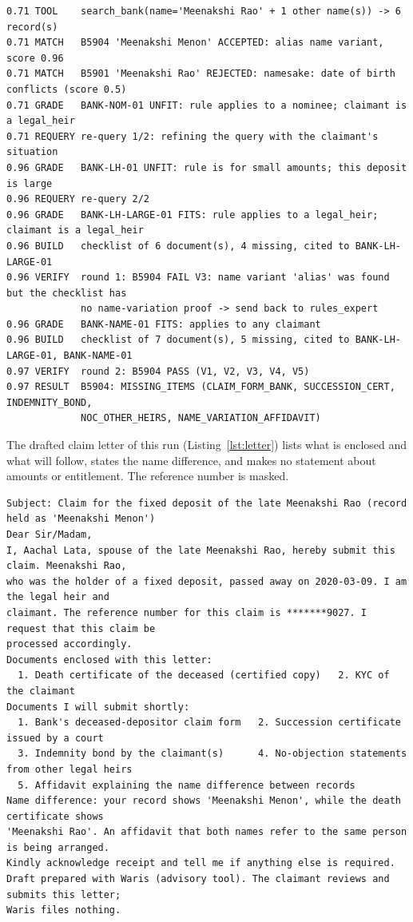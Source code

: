 \documentclass[12pt,a4paper,oneside]{report}
\begin{document}
\begin{lstlisting}[numbers=none,basicstyle=\ttfamily\tiny\setstretch{1.0},caption={Trace of a run with two re-queries and a Verifier send-back (case h19), condensed.},label={lst:h19}]
0.71 TOOL    search_bank(name='Meenakshi Rao' + 1 other name(s)) -> 6 record(s)
0.71 MATCH   B5904 'Meenakshi Menon' ACCEPTED: alias name variant, score 0.96
0.71 MATCH   B5901 'Meenakshi Rao' REJECTED: namesake: date of birth conflicts (score 0.5)
0.71 GRADE   BANK-NOM-01 UNFIT: rule applies to a nominee; claimant is a legal_heir
0.71 REQUERY re-query 1/2: refining the query with the claimant's situation
0.96 GRADE   BANK-LH-01 UNFIT: rule is for small amounts; this deposit is large
0.96 REQUERY re-query 2/2
0.96 GRADE   BANK-LH-LARGE-01 FITS: rule applies to a legal_heir; claimant is a legal_heir
0.96 BUILD   checklist of 6 document(s), 4 missing, cited to BANK-LH-LARGE-01
0.96 VERIFY  round 1: B5904 FAIL V3: name variant 'alias' was found but the checklist has
             no name-variation proof -> send back to rules_expert
0.96 GRADE   BANK-NAME-01 FITS: applies to any claimant
0.96 BUILD   checklist of 7 document(s), 5 missing, cited to BANK-LH-LARGE-01, BANK-NAME-01
0.97 VERIFY  round 2: B5904 PASS (V1, V2, V3, V4, V5)
0.97 RESULT  B5904: MISSING_ITEMS (CLAIM_FORM_BANK, SUCCESSION_CERT, INDEMNITY_BOND,
             NOC_OTHER_HEIRS, NAME_VARIATION_AFFIDAVIT)
\end{lstlisting}

The drafted claim letter of this run (Listing~\ref{lst:letter}) lists what is enclosed and what will follow, states the name difference, and makes no statement about amounts or entitlement. The reference number is masked.

\begin{lstlisting}[numbers=none,basicstyle=\ttfamily\tiny\setstretch{1.0},caption={Claim letter drafted for case h19 (synthetic).},label={lst:letter}]
Subject: Claim for the fixed deposit of the late Meenakshi Rao (record held as 'Meenakshi Menon')
Dear Sir/Madam,
I, Aachal Lata, spouse of the late Meenakshi Rao, hereby submit this claim. Meenakshi Rao,
who was the holder of a fixed deposit, passed away on 2020-03-09. I am the legal heir and
claimant. The reference number for this claim is *******9027. I request that this claim be
processed accordingly.
Documents enclosed with this letter:
  1. Death certificate of the deceased (certified copy)   2. KYC of the claimant
Documents I will submit shortly:
  1. Bank's deceased-depositor claim form   2. Succession certificate issued by a court
  3. Indemnity bond by the claimant(s)      4. No-objection statements from other legal heirs
  5. Affidavit explaining the name difference between records
Name difference: your record shows 'Meenakshi Menon', while the death certificate shows
'Meenakshi Rao'. An affidavit that both names refer to the same person is being arranged.
Kindly acknowledge receipt and tell me if anything else is required.
Draft prepared with Waris (advisory tool). The claimant reviews and submits this letter;
Waris files nothing.
\end{lstlisting}
\end{document}
